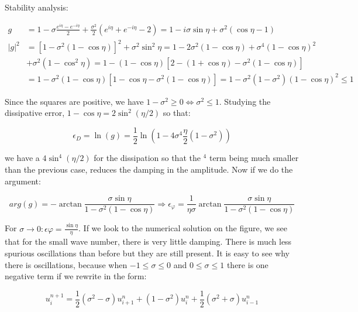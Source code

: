 Stability analysis: 

\begin{equation}
\begin{aligned}
g &= 1 - \sigma \frac{e^{i\eta} - e^{-i\eta}}{2} + \frac{\sigma ^2}{2} (e^{i\eta} + e^{-i\eta}-2) = 1 - i \sigma \sin \eta + \sigma ^2 (\cos \eta -1)\\
|g|^2 &= [1 - \sigma ^2 (1 -\cos \eta)]^2 +\sigma^2 \sin ^2 \eta = 1 - 2 \sigma ^2 (1- \cos \eta) + \sigma ^4 (1 - \cos \eta)^2 \\
&+ \sigma ^2 (1-\cos ^2\eta)= 1 - (1 -\cos \eta) [2- (1 + \cos \eta) - \sigma ^2 (1 - \cos \eta)] \\
 &= 1 - \sigma ^2 (1-\cos \eta ) [1 - \cos \eta - \sigma ^2 (1- \cos \eta)] = 1 - \sigma ^2 (1- \sigma ^2) (1 - \cos \eta )^2 \leq 1
\end{aligned}
\end{equation}

Since the squares are positive, we have $1 - \sigma ^2 \geq 0\Leftrightarrow \sigma ^2 \leq 1$. Studying the dissipative error, $1 - \cos \eta = 2\sin ^2 (\eta /2)$ so that: 

\begin{equation}
\epsilon _D = \ln(g) = \frac{1}{2}\ln (1-4\sigma ^4\frac{\eta}{2}(1-\sigma ^2))
\end{equation}

we have a $4 \sin ^4 (\eta /2)$ for the dissipation so that the $^4$ term being much smaller than the previous case, reduces the damping in the amplitude. Now if we do the argument: 

\begin{equation}
arg(g) = - \arctan \frac{\sigma \sin \eta }{1 - \sigma ^2 (1 - \cos \eta)} \Rightarrow \epsilon _\varphi = \frac{1}{\eta \sigma} \arctan \frac{\sigma \sin \eta}{1- \sigma ^2 (1- \cos \eta)}
\end{equation} 

For $\sigma \rightarrow 0: \epsilon \varphi = \frac{\sin \eta}{\eta}$. If we look to the numerical solution on the figure, we see that for the small wave number, there is very little damping. There is much less spurious oscillations than before but they are still present. It is easy to see why there is oscillations, because when $-1 \leq \sigma\leq 0$ and $0\leq \sigma \leq 1$ there is one negative term if we rewrite in the form: 

\begin{equation}
u_i^{n+1} = \frac{1}{2}(\sigma ^2 - \sigma)u^n_{i+1} + (1-\sigma ^2)u_i^{n}+ \frac{1}{2}(\sigma ^2 + \sigma) u_{i-1}^n
\end{equation}

